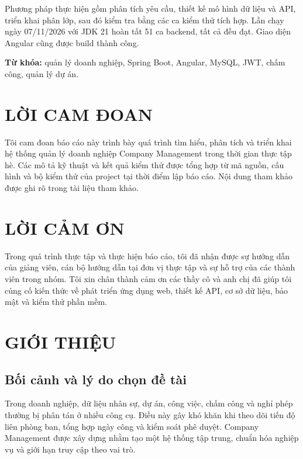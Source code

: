 \documentclass[12pt,a4paper,oneside]{report}
\newcommand{\projectname}{Company Management}
\begin{document}
Phương pháp thực hiện gồm phân tích yêu cầu, thiết kế mô hình dữ liệu và API, triển khai phân lớp, sau đó kiểm tra bằng các ca kiểm thử tích hợp. Lần chạy ngày 07/11/2026 với JDK 21 hoàn tất 51 ca backend, tất cả đều đạt. Giao diện Angular cũng được build thành công.

\noindent\textbf{Từ khóa:} quản lý doanh nghiệp, Spring Boot, Angular, MySQL, JWT, chấm công, quản lý dự án.

\chapter*{LỜI CAM ĐOAN}
Tôi cam đoan báo cáo này trình bày quá trình tìm hiểu, phân tích và triển khai hệ thống quản lý doanh nghiệp \projectname{} trong thời gian thực tập hè. Các mô tả kỹ thuật và kết quả kiểm thử được tổng hợp từ mã nguồn, cấu hình và bộ kiểm thử của project tại thời điểm lập báo cáo. Nội dung tham khảo được ghi rõ trong tài liệu tham khảo.

\chapter*{LỜI CẢM ƠN}
Trong quá trình thực tập và thực hiện báo cáo, tôi đã nhận được sự hướng dẫn của giảng viên, cán bộ hướng dẫn tại đơn vị thực tập và sự hỗ trợ của các thành viên trong nhóm. Tôi xin chân thành cảm ơn các thầy cô và anh chị đã giúp tôi củng cố kiến thức về phát triển ứng dụng web, thiết kế API, cơ sở dữ liệu, bảo mật và kiểm thử phần mềm.





\clearpage{}

\chapter{GIỚI THIỆU}
\section{Bối cảnh và lý do chọn đề tài}
Trong doanh nghiệp, dữ liệu nhân sự, dự án, công việc, chấm công và nghỉ phép thường bị phân tán ở nhiều công cụ. Điều này gây khó khăn khi theo dõi tiến độ liên phòng ban, tổng hợp ngày công và kiểm soát phê duyệt. \projectname{} được xây dựng nhằm tạo một hệ thống tập trung, chuẩn hóa nghiệp vụ và giới hạn truy cập theo vai trò.
\end{document}
